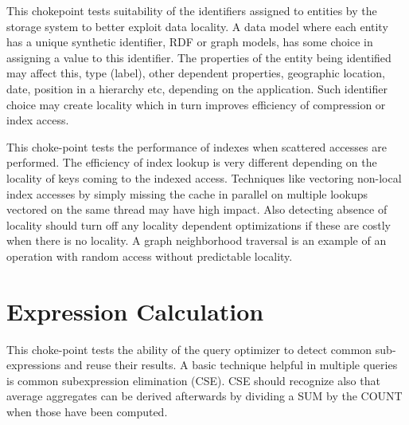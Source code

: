 


This chokepoint tests suitability of the identifiers assigned to entities by the storage system to better exploit data locality. A data model where each entity has a unique synthetic identifier,
\eg RDF or graph models, has some choice in assigning a value to this identifier.
The properties of the entity being identified may affect this, \eg type (label), other dependent properties,
\eg geographic location, date, position in a hierarchy etc, depending on the application. Such identifier choice may create locality which in turn improves efficiency of compression or index access.




This choke-point tests the performance of indexes when scattered accesses are performed. The efficiency of index lookup is very different depending on the locality of keys coming to the indexed access.
Techniques like vectoring non-local index accesses by simply missing the cache in parallel on multiple lookups vectored on the same thread may have high impact.
Also detecting absence of locality should turn off any locality dependent optimizations if these are costly when there is no locality. A graph neighborhood traversal is an example of an operation with random access without predictable locality.




\section{Expression Calculation}


This choke-point tests the ability of the query optimizer to detect common sub-expressions and reuse their results. A basic technique helpful in multiple queries is common subexpression elimination (CSE).
CSE should recognize also that average aggregates can be derived afterwards by dividing a SUM by the COUNT when those have been computed.

